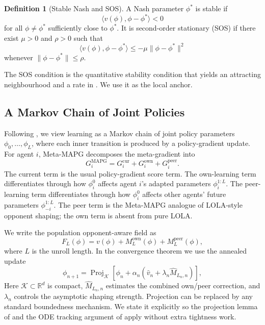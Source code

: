 \documentclass{article}
\theoremstyle{plain}
\theoremstyle{definition}
\newtheorem{definition}[theorem]{Definition}
\theoremstyle{remark}
\newcommand{\R}{\mathbb{R}}
\newcommand{\K}{\mathcal{K}}
\newcommand{\Proj}{\operatorname{Proj}}
\begin{document}
\begin{definition}[Stable Nash and SOS]\label{def:sos}
A Nash parameter $\phi^\ast$ is stable if
\[
\langle v(\phi),\phi-\phi^\ast\rangle <0
\]
for all $\phi\ne\phi^\ast$ sufficiently close to $\phi^\ast$. It is second-order stationary (SOS) if there exist $\mu>0$ and $\rho>0$ such that
\[
\langle v(\phi),\phi-\phi^\ast\rangle\le -\mu\|\phi-\phi^\ast\|^2
\]
whenever $\|\phi-\phi^\ast\|\le\rho$.
\end{definition}

The SOS condition is the quantitative stability condition that yields an attracting neighbourhood and a rate in \citet{giannou2022convergence}. We use it as the local anchor.

\subsection{A Markov Chain of Joint Policies}

Following \citet{kim2021meta}, we view learning as a Markov chain of joint policy parameters $\phi_0,\ldots,\phi_L$, where each inner transition is produced by a policy-gradient update. For agent $i$, Meta-MAPG decomposes the meta-gradient into
\[
G_i^{\mathrm{MAPG}}
=G_i^{\mathrm{cur}}+G_i^{\mathrm{own}}+G_i^{\mathrm{peer}}.
\]
The current term is the usual policy-gradient score term. The own-learning term differentiates through how $\phi_i^0$ affects agent $i$'s adapted parameters $\phi_i^{1:L}$. The peer-learning term differentiates through how $\phi_i^0$ affects other agents' future parameters $\phi_{-i}^{1:L}$. The peer term is the Meta-MAPG analogue of LOLA-style opponent shaping; the own term is absent from pure LOLA.

We write the population opponent-aware field as
\[
F_L(\phi)=v(\phi)+M_L^{\mathrm{own}}(\phi)+M_L^{\mathrm{peer}}(\phi),
\]
where $L$ is the unroll length. In the convergence theorem we use the annealed update
\begin{equation}\label{eq:update}
\phi_{n+1}
=\Proj_{\K}\!\left[\phi_n+\alpha_n\left(\hat v_n+\lambda_n\hat M_{L_n,n}\right)\right],
\end{equation}
Here $\K\subset\R^d$ is compact, $\hat M_{L_n,n}$ estimates the combined own/peer correction, and $\lambda_n$ controls the asymptotic shaping strength. Projection can be replaced by any standard boundedness mechanism. We state it explicitly so the projection lemma of \citet{kushner1978stochastic} and the ODE tracking argument of \citet{borkar2008stochastic} apply without extra tightness work.
\end{document}

